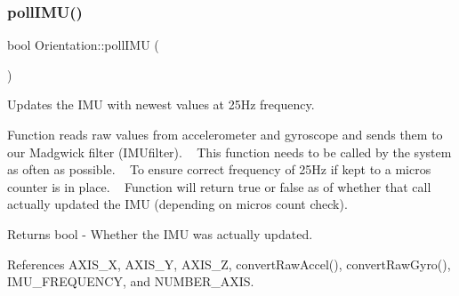 \subsubsection{\texorpdfstring{poll\+I\+M\+U()}{pollIMU()}}
{\footnotesize\ttfamily bool Orientation\+::poll\+I\+MU (\begin{DoxyParamCaption}{ }\end{DoxyParamCaption})}



Updates the I\+MU with newest values at 25\+Hz frequency. 

Function reads raw values from accelerometer and gyroscope and sends them to our Madgwick filter (I\+M\+Ufilter). ~\newline
This function needs to be called by the system as often as possible. ~\newline
To ensure correct frequency of 25\+Hz if kept to a micros counter is in place. ~\newline
Function will return true or false as of whether that call actually updated the I\+MU (depending on micros count check).

\begin{DoxyReturn}{Returns}
bool -\/ Whether the I\+MU was actually updated. 
\end{DoxyReturn}


References A\+X\+I\+S\+\_\+X, A\+X\+I\+S\+\_\+Y, A\+X\+I\+S\+\_\+Z, convert\+Raw\+Accel(), convert\+Raw\+Gyro(), I\+M\+U\+\_\+\+F\+R\+E\+Q\+U\+E\+N\+CY, and N\+U\+M\+B\+E\+R\+\_\+\+A\+X\+IS.


